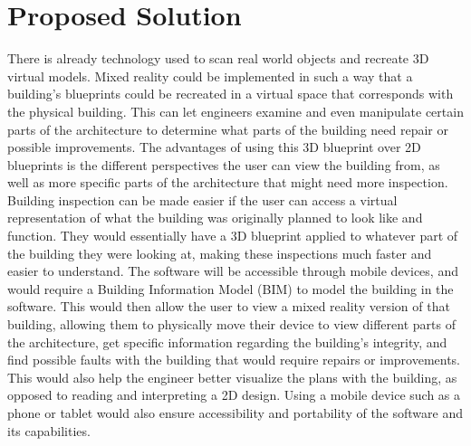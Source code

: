 \documentclass[onecolumn, draftclsnofoot,10pt, compsoc]{IEEEtran}
\begin{document}
\section{Proposed Solution}
There is already technology used to scan real world objects and recreate 3D virtual models. Mixed reality could be implemented in such a way that a building’s blueprints could be recreated in a virtual space that corresponds with the physical building. This can let engineers examine and even manipulate certain parts of the architecture to determine what parts of the building need repair or possible improvements. The advantages of using this 3D blueprint over 2D blueprints is the different perspectives the user can view the building from, as well as more specific parts of the architecture that might need more inspection. \newline
Building inspection can be made easier if the user can access a virtual representation of what the building was originally planned to look like and function. They would essentially have a 3D blueprint applied to whatever part of the building they were looking at, making these inspections much faster and easier to understand. The software will be accessible through mobile devices, and would require a Building Information Model (BIM) to model the building in the software. This would then allow the user to view a mixed reality version of that building, allowing them to physically move their device to view different parts of the architecture, get specific information regarding the building's integrity, and find possible faults with the building that would require repairs or improvements. This would also help the engineer better visualize the plans with the building, as opposed to reading and interpreting a 2D design. Using a mobile device such as a phone or tablet would also ensure accessibility and portability of the software and its capabilities.
\end{document}
